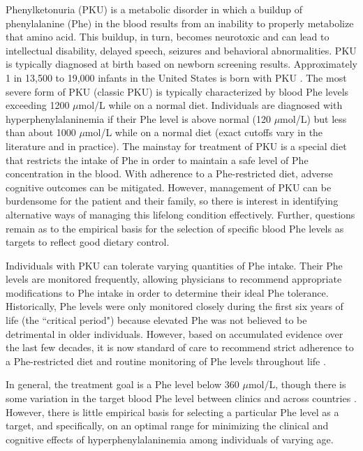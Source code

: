\documentclass{svjour3}                     %
\begin{document}
Phenylketonuria (PKU) is a metabolic disorder in which a buildup of phenylalanine (Phe) in the blood results from an inability to properly metabolize that amino acid. This buildup, in turn, becomes neurotoxic and can lead to intellectual disability, delayed speech, seizures and behavioral abnormalities. PKU is typically diagnosed at birth based on newborn screening results. Approximately 1 in 13,500 to 19,000 infants in the United States is born with PKU \citep{Hegge:2009ep,NationalInstitutesofHealthConsensusDevelopmentPanel:2001ti}. The most severe form of PKU (classic PKU) is typically characterized by blood Phe levels exceeding 1200 $\mu$mol/L while on a normal diet. Individuals are diagnosed with hyperphenylalaninemia if their Phe level is above normal (120 $\mu$mol/L) but less than about 1000 $\mu$mol/L while on a normal diet (exact cutoffs vary in the literature and in practice). The mainstay for treatment of PKU is a special diet that restricts the intake of Phe in order to maintain a safe level of Phe concentration in the blood.  With adherence to a Phe-restricted diet, adverse cognitive outcomes can be mitigated. However, management of PKU can be burdensome for the patient and their family, so there is interest in identifying alternative ways of managing this lifelong condition effectively. Further, questions remain as to the empirical basis for the selection of specific blood Phe levels as targets to reflect good dietary control.

Individuals with PKU can tolerate varying quantities of Phe intake. Their Phe levels are monitored frequently, allowing physicians to recommend appropriate modifications to Phe intake in order to determine their ideal Phe tolerance. Historically, Phe levels were only monitored closely during the first six years of life (the ``critical period") because elevated Phe was not believed to be detrimental in older individuals. However, based on accumulated evidence over the last few decades, it is now standard of care to recommend strict adherence to a Phe-restricted diet and routine monitoring of Phe levels throughout life \citep{NationalInstitutesofHealthConsensusDevelopmentPanel:2001ti, Koch:2002ul}.

In general, the treatment goal is a Phe level below 360 $\mu$mol/L, though there is some variation in the target blood Phe level between clinics and across countries \citep{NationalInstitutesofHealthConsensusDevelopmentPanel:2001ti, Giovannini:2007kg}. However, there is little empirical basis for selecting a particular Phe level as a target, and specifically, on an optimal range for minimizing the clinical and cognitive effects of hyperphenylalaninemia among individuals of varying age.
\end{document}
